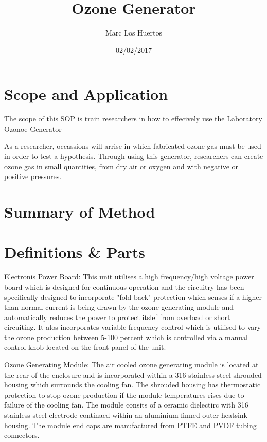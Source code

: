 \documentclass[12pt]{../SOP2}
\title{Ozone Generator}
\date{02/02/2017}
\author{Marc Los Huertos}
\begin{document}


\maketitle

\section{Scope and Application}

\NP The scope of this SOP is train researchers in how to effecively use the Laboratory Ozonoe Generator 

\NP As a researcher, occassions will arrise in which fabricated ozone gas must be used in order to test a hypothesis. Through using this generator, researchers can create ozone gas in small quantities, from dry air or oxygen and with negative or positive pressures. 

\section{Summary of Method}

\section{Definitions \& Parts}

\NP Electronis Power Board: This unit utilises a high frequency/high voltage power board which is designed for continuous operation and the circuitry has been specifically designed to incorporate "fold-back" protection which senses if a higher than normal current is being drawn by the ozone generating module and automatically reduces the power to protect itslef from overload or short circuiting. It alos incorporates variable frequency control which is utilised to vary the ozone production between 5-100 percent which is controlled via a manual control knob located on the front panel of the unit. 

\NP Ozone Generating Module: The air cooled ozone generating module is located at the rear of the enclosure and is incorporated within a 316 stainless steel shrouded housing which surrounds the cooling fan. The shrouded housing has thermostatic protection to stop ozone production if the module temperatures rises due to failure of the cooling fan.
\NP The module consits of a ceramic dielectirc with 316 stainless steel electrode continaed within an aluminium finned outer heatsink housing. The module end caps are manufactured from PTFE and PVDF tubing connectors. 
  
\end{document}
